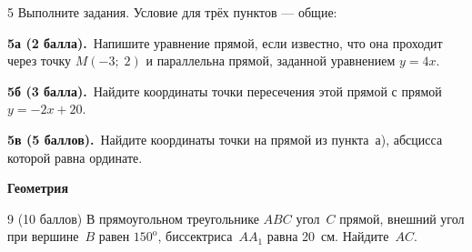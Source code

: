 \bigskip

\begin{problem}{5} Выполните задания. Условие для трёх пунктов --- общие:

\smallskip

\noindent \textbf{5а (2 балла).}~Напишите уравнение прямой, если известно, что она проходит через точку $M(-3;\;2)$ и параллельна прямой, заданной уравнением $y = 4x$.

\smallskip

\noindent \textbf{5б (3 балла).}~Найдите координаты точки пересечения этой прямой с прямой $y=-2x+20$.

\smallskip

\noindent \textbf{5в (5 баллов).}~Найдите координаты точки на прямой из пункта~а), абсцисса которой равна ординате.
\end{problem}

\smallskip

\noindent{}

\begin{center}
\textbf{Геометрия}
\end{center}


\smallskip


\smallskip


\smallskip

\begin{problem}{9 (10 баллов)}
В прямоугольном треугольнике $ABC$ угол~$C$ прямой, внешний угол при вершине~$B$ равен $150^{\text{o}}$, биссектриса~$AA_1$ равна 20~см. Найдите~$AC$.
\end{problem}

\noindent{}

